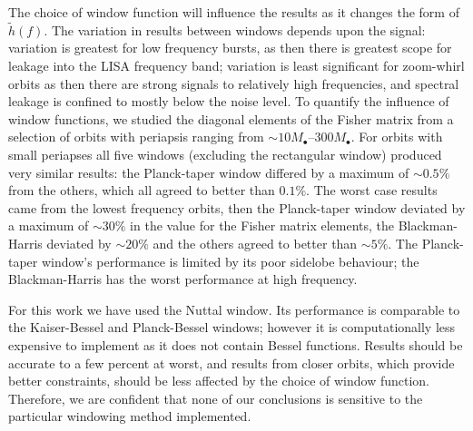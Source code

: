 \documentclass[useAMS,usedcolumn,usegraphicx,usenatbib]{mn2e}
\begin{document}
The choice of window function will influence the results as it changes the form of $\widetilde{h}(f)$. The variation in results between windows depends upon the signal: variation is greatest for low frequency bursts, as then there is greatest scope for leakage into the LISA frequency band; variation is least significant for zoom-whirl orbits as then there are strong signals to relatively high frequencies, and spectral leakage is confined to mostly below the noise level. To quantify the influence of window functions, we studied the diagonal elements of the Fisher matrix from a selection of orbits with periapsis ranging from $\sim 10 M_\bullet$--$300 M_\bullet$. For orbits with small periapses all five windows (excluding the rectangular window) produced very similar results: the Planck-taper window differed by a maximum of $\sim 0.5\%$ from the others, which all agreed to better than $0.1\%$. The worst case results came from the lowest frequency orbits, then the Planck-taper window deviated by a maximum of $\sim 30\%$ in the value for the Fisher matrix elements, the Blackman-Harris deviated by $\sim 20\%$ and the others agreed to better than $\sim 5\%$. The Planck-taper window's performance is limited by its poor sidelobe behaviour; the Blackman-Harris has the worst performance at high frequency.

For this work we have used the Nuttal window. Its performance is comparable to the Kaiser-Bessel and Planck-Bessel windows; however it is computationally less expensive to implement as it does not contain Bessel functions. Results should be accurate to a few percent at worst, and results from closer orbits, which provide better constraints, should be less affected by the choice of window function. Therefore, we are confident that none of our conclusions is sensitive to the particular windowing method implemented.

\bsp

\label{lastpage}
\end{document}
